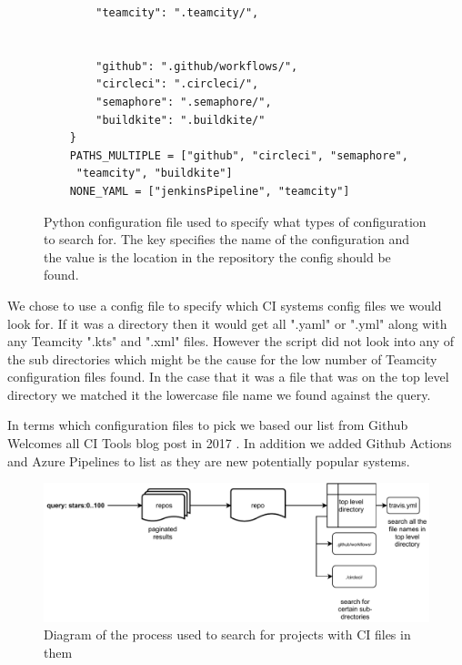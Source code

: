 \documentclass[twoside,12pt,titlepage,a4paper]{article}
\begin{document}
\begin{figure}[!htbp]
\begin{minipage}{.48\textwidth}
\begin{verbatim}
        "teamcity": ".teamcity/",
    
    
        "github": ".github/workflows/",
        "circleci": ".circleci/",
        "semaphore": ".semaphore/",
        "buildkite": ".buildkite/"
    }
    PATHS_MULTIPLE = ["github", "circleci", "semaphore",
     "teamcity", "buildkite"]
    NONE_YAML = ["jenkinsPipeline", "teamcity"]
    \end{verbatim}
    \caption{Python configuration file used to specify what types of configuration to search for. The key specifies the name of the configuration and the value is the location in the repository the config should be found.}
  \end{minipage}
\end{figure}

We chose to use a config file to specify which CI systems config files we would look for. If it was a directory then it would get all ".yaml" or ".yml" along with any Teamcity ".kts" and ".xml" files. However the script did not look into any of the sub directories which might be the cause for the low number of Teamcity configuration files found. In the case that it was a file that was on the top level directory we matched it the lowercase file name we found against the query.

In terms which configuration files to pick we based our list from Github Welcomes all CI Tools blog post in 2017 \cite{Github2017}. In addition we added Github Actions and Azure Pipelines to list as they are new potentially popular systems. 

\begin{figure}[h]
  \centering
  \includegraphics[width=\textwidth]{methadology diagram.pdf}
  
  \caption[alt text]{Diagram of the process used to search for projects with CI files in them}
  \label{image_methadolgoy_diagram}
\end{figure}
\end{document}
